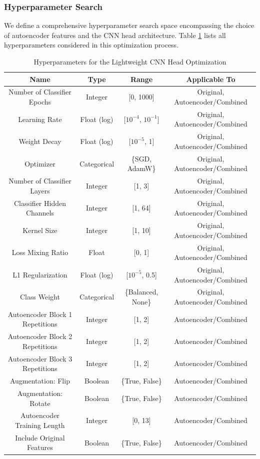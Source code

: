 \documentclass[10pt,letterpaper]{article}
\begin{document}
\subsubsection{Hyperparameter Search}

We define a comprehensive hyperparameter search space encompassing the choice of autoencoder features and the CNN head architecture. Table \ref{tab:hyperparams} lists all hyperparameters considered in this optimization process.

\begin{table}[ht]
    \centering
    \caption{Hyperparameters for the Lightweight CNN Head Optimization}
    \label{tab:hyperparams}
    \begin{tabular}{cccc}
    \hline
    \textbf{Name} & \textbf{Type} & \textbf{Range} & \textbf{Applicable To} \\
    \hline
    Number of Classifier Epochs & Integer & [0, 1000] & Original, Autoencoder/Combined \\
    Learning Rate & Float (log) & [$10^{-4}$, $10^{-1}$] & Original, Autoencoder/Combined \\
    Weight Decay & Float (log) & [$10^{-5}$, 1] & Original, Autoencoder/Combined \\
    Optimizer & Categorical & \{SGD, AdamW\} & Original, Autoencoder/Combined \\
    Number of Classifier Layers & Integer & [1, 3] & Original, Autoencoder/Combined \\
    Classifier Hidden Channels & Integer & [1, 64] & Original, Autoencoder/Combined \\
    Kernel Size & Integer & [1, 10] & Original, Autoencoder/Combined \\
    Loss Mixing Ratio & Float & [0, 1] & Original, Autoencoder/Combined \\
    L1 Regularization & Float (log) & [$10^{-5}$, 0.5] & Original, Autoencoder/Combined \\
    Class Weight & Categorical & \{Balanced, None\} & Original, Autoencoder/Combined \\
    Autoencoder Block 1 Repetitions & Integer & [1, 2] & Autoencoder/Combined \\
    Autoencoder Block 2 Repetitions & Integer & [1, 2] & Autoencoder/Combined \\
    Autoencoder Block 3 Repetitions & Integer & [1, 2] & Autoencoder/Combined \\
    Augmentation: Flip & Boolean & \{True, False\} & Autoencoder/Combined \\
    Augmentation: Rotate & Boolean & \{True, False\} & Autoencoder/Combined \\
    Autoencoder Training Length & Integer & [0, 13] & Autoencoder/Combined \\
    Include Original Features & Boolean & \{True, False\} & Autoencoder/Combined \\
    \hline
    \end{tabular}
\end{table}
\end{document}
